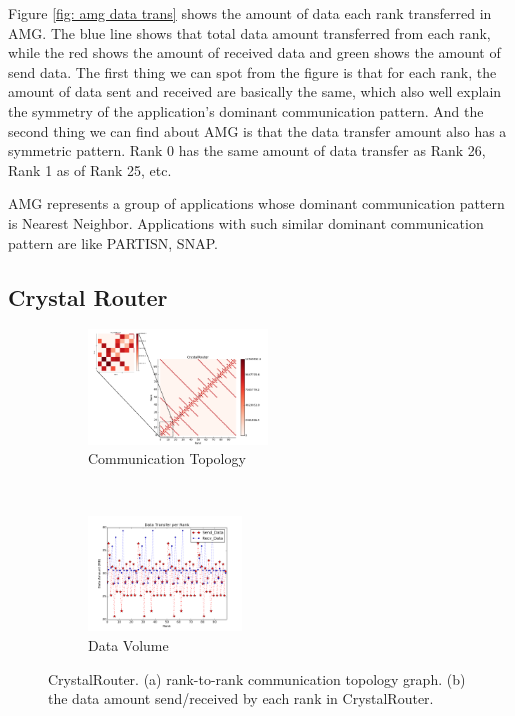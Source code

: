 \documentclass[conference]{IEEEtran}
\begin{document}
Figure \ref{fig: amg data trans} shows the amount of data each rank transferred in AMG. The blue line shows that total data amount transferred from each rank, while the red shows the amount of received data and green shows the amount of send data. The first thing we can spot from the figure is that for each rank, the amount of data sent and received are basically the same, which also well explain the symmetry of the application's dominant communication pattern. And the second thing we can find about AMG is that the data transfer amount also has a symmetric pattern. Rank 0 has the same amount of data transfer as Rank 26, Rank 1 as of Rank 25, etc.

AMG represents a group of applications whose dominant communication pattern is Nearest Neighbor. Applications with such similar dominant communication pattern are like PARTISN, SNAP\cite{design forward webpage}.


\subsection{Crystal Router}
\label{sec:crystalrouter}

\begin{figure}[t!]
    \centering
    \begin{subfigure}[t]{0.22\textwidth}
        \centering
        \includegraphics[height=1.2in]{figs/appstudy/cr/cr_pip}
        \caption{Communication Topology}
        \label{fig: cr communication topology}
    \end{subfigure}
    ~
    \begin{subfigure}[t]{0.22\textwidth}
        \centering
        \includegraphics[height=1.2in]{figs/appstudy/cr/cr_data_transfer}
        \caption{Data Volume}
        \label{fig: cr data trans}
    \end{subfigure}
    \caption{CrystalRouter. (a) rank-to-rank communication topology graph. (b) the data amount send/received by each rank in CrystalRouter. }
\end{figure}
\end{document}
